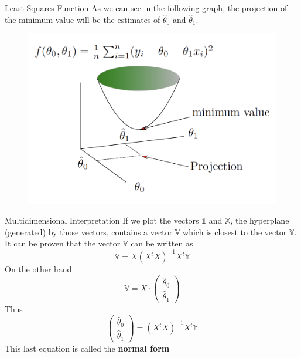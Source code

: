 \documentclass{beamer}
\begin{document}
\begin{frame}{Least Squares Function}
	As we can see in the following graph, the projection of the minimum value will be the estimates of $\hat{\theta}_0$ and $\hat{\theta}_1$.
	\begin{figure}[h]
		\centering
		\includegraphics[scale=0.5]{../../Figures/fig_minfunc.png}
	\end{figure}
\end{frame}
	
\begin{frame}{Multidimensional Interpretation}
If we plot the vectors $\mathbb{1}$ and $\mathbb{X}$, the hyperplane (generated) by those vectors, contains a vector $\mathbb{V}$ which is closest to the vector $\mathbb{Y}$.  It can be proven that the vector $\mathbb{V}$ can be written as
\begin{equation*}
	\mathbb{V} = X (X^t X)^{-1} X^t \mathbb{Y}
\end{equation*}
On the other hand 
\begin{equation*}
	\mathbb{V}= X \cdot \begin{pmatrix} \hat{\theta}_0\\ \hat{\theta}_1 \end{pmatrix}
\end{equation*}
Thus
\begin{equation}
	\begin{pmatrix}
		\hat{\theta}_0\\ \hat{\theta}_1
\end{pmatrix} = (X^t X)^{-1} X^t \mathbb{Y}
\label{eq:normeq}
\end{equation}	
This last equation is called the {\bf normal form}
\end{frame}
\end{document}
